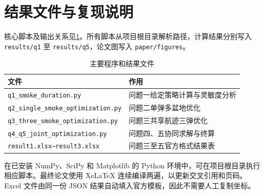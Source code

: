 \section{结果文件与复现说明}

核心脚本及输出关系见\cref{tab:appendix-files}。所有脚本从项目根目录解析路径，计算结果分别写入 \texttt{results/q1} 至 \texttt{results/q5}，论文图写入 \texttt{paper/figures}。

\begin{table}[!htbp]
 \centering
 \caption{主要程序和结果文件}
 \label{tab:appendix-files}
 \begin{tabular}{ll}
  \toprule[1.5pt]
  文件 & 作用 \\
  \midrule[1pt]
  \texttt{q1\_smoke\_duration.py} & 问题一给定策略计算与灵敏度分析 \\
  \texttt{q2\_single\_smoke\_optimization.py} & 问题二单弹多盆地优化 \\
  \texttt{q3\_three\_smoke\_optimization.py} & 问题三共享航迹三弹优化 \\
  \texttt{q4\_q5\_joint\_optimization.py} & 问题四、五协同求解与终算 \\
  \texttt{result1.xlsx--result3.xlsx} & 问题三至五官方格式结果表 \\
  \bottomrule[1.5pt]
 \end{tabular}
\end{table}

在已安装 NumPy、SciPy 和 Matplotlib 的 Python 环境中，可在项目根目录执行相应脚本。最终论文使用 XeLaTeX 连续编译两遍，以更新交叉引用和页码。Excel 文件由同一份 JSON 结果自动填入官方模板，因此不需要人工复制坐标。
\endinput
\section{蒙特卡洛算法--matlab 代码}

\begin{lstlisting}[language=matlab]
% 蒙特卡洛估算圆周率
N = 1e6; % 随机点数量
x = rand(N,1);
y = rand(N,1);
inside = (x.^2 + y.^2) <= 1;
pi_est = 4 * sum(inside) / N;
fprintf('估算的值: %.6f\n', pi_est);
\end{lstlisting}
